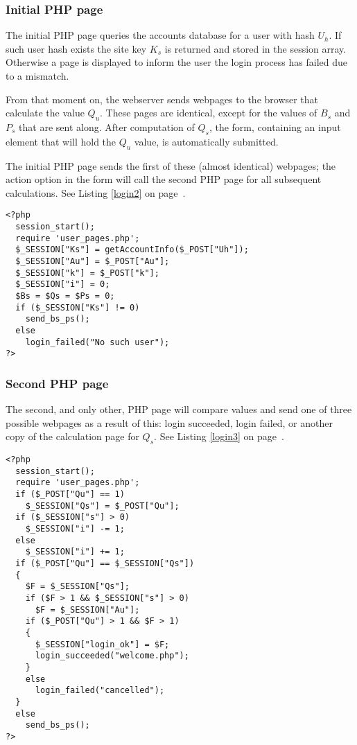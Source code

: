 \subsubsection{Initial PHP page}
The initial PHP page queries the accounts database for a user with hash $U_h$.
If such user hash exists the site key $K_s$ is returned and stored in the session array.
Otherwise a page is displayed to inform the user the login process has failed due to a mismatch.
\par
From that moment on,
the webserver sends webpages to the browser that calculate the value $Q_u$.
These pages are identical, except for the values of $B_s$ and $P_s$ that are sent along.
After computation of $Q_s$, the form,
containing an input element that will hold the $Q_u$ value,
is automatically submitted.
\par
The initial PHP page sends the first of these
(almost identical)
webpages;
the action option in the form will call the second PHP page for all subsequent calculations.
See Listing \ref{login2} on page~\pageref{login2}.
\lstset{language=PHP}
\begin{lstlisting}[frame=lines,float=tbhp,label=login2,title=login2.php,caption=Second Login Page]
<?php
  session_start();
  require 'user_pages.php';
  $_SESSION["Ks"] = getAccountInfo($_POST["Uh"]);
  $_SESSION["Au"] = $_POST["Au"];
  $_SESSION["k"] = $_POST["k"];
  $_SESSION["i"] = 0;
  $Bs = $Qs = $Ps = 0;
  if ($_SESSION["Ks"] != 0)
    send_bs_ps();
  else
    login_failed("No such user");
?>
\end{lstlisting}
\subsubsection{Second PHP page}
The second,
and only other,
PHP page will compare values and send one of three possible webpages as a result of this:
login succeeded,
login failed,
or another copy of the calculation page for $Q_s$.
See Listing \ref{login3} on page~\pageref{login3}.
\lstset{language=PHP}
\begin{lstlisting}[frame=lines,float=tbhp,label=login3,title=login3.php,caption=Final Login Page]
<?php
  session_start();
  require 'user_pages.php';
  if ($_POST["Qu"] == 1)
    $_SESSION["Qs"] = $_POST["Qu"];
  if ($_SESSION["s"] > 0)
    $_SESSION["i"] -= 1;
  else
    $_SESSION["i"] += 1;
  if ($_POST["Qu"] == $_SESSION["Qs"])
  {
    $F = $_SESSION["Qs"];
    if ($F > 1 && $_SESSION["s"] > 0)
      $F = $_SESSION["Au"];
    if ($_POST["Qu"] > 1 && $F > 1)
    {
      $_SESSION["login_ok"] = $F;
      login_succeeded("welcome.php");
    }
    else
      login_failed("cancelled");
  }
  else
    send_bs_ps();
?>
\end{lstlisting}
\clearpage
